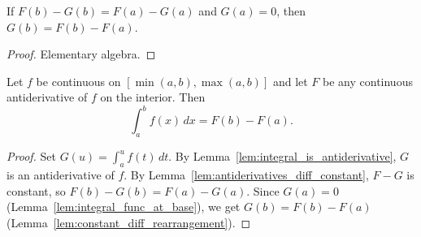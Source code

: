 \begin{lemma}
    \label{lem:constant_diff_rearrangement}

    If $F(b) - G(b) = F(a) - G(a)$ and $G(a) = 0$, then $G(b) = F(b) - F(a)$.
\end{lemma}
\begin{proof}
    Elementary algebra.
\end{proof}

\begin{corollary}
    \label{cor:ftc_eval}

    Let $f$ be continuous on $[\min(a,b), \max(a,b)]$ and let $F$ be any continuous antiderivative of $f$ on the interior. Then
    \[
      \int_a^b f(x)\,dx = F(b) - F(a).
    \]
\end{corollary}
\begin{proof}
    Set $G(u) = \int_a^u f(t)\,dt$. By Lemma~\ref{lem:integral_is_antiderivative}, $G$ is an antiderivative of $f$. By Lemma~\ref{lem:antiderivatives_diff_constant}, $F - G$ is constant, so $F(b) - G(b) = F(a) - G(a)$. Since $G(a) = 0$ (Lemma~\ref{lem:integral_func_at_base}), we get $G(b) = F(b) - F(a)$ (Lemma~\ref{lem:constant_diff_rearrangement}).
\end{proof}


